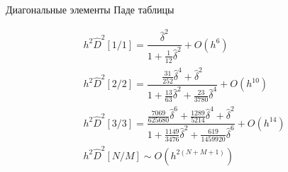 \documentclass[10pt,pdf,hyperref={unicode},xcolor=dvipsnames]{beamer}
\newcommand{\hD}{\hat{D}}
\begin{document}
\begin{frame}{Диагональные элементы Паде таблицы }
    \begin{block}{}
        \begin{gather}
            h^2 \hD^2 [1/1] = \dfrac{\hat{\delta}^2}{1 + \frac{1}{12} \hat{\delta}^2} + O(h^6) \\
            h^2 \hD^2 [2/2] = \dfrac{\frac{31}{252} \hat{\delta}^4 + \hat{\delta}^2}{1 + \frac{13}{63} \hat{\delta}^2 + \frac{23}{3780} \hat{\delta}^4} + O(h^{10}) \\
            h^2 \hD^2 [3/3] = \dfrac{\frac{7069}{625680} \hat{\delta}^6 + \frac{1289}{5214} \hat{\delta}^4 + \hat{\delta}^2}{1 + \frac{1149}{3476} \hat{\delta}^2 + \frac{619}{1459920} \hat{\delta}^6} + O(h^{14}) \\
            h^2 \hD^2 [N/M] \sim O(h^{2(N+M+1)})
        \end{gather}
    \end{block}
\end{frame}
\end{document}
